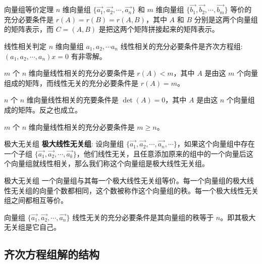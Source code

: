 \documentclass[a4paper,12pt]{ctexart}
\begin{document}
\begin{mythm}{向量组等价定理}{}
    $n$ 维向量组 $\{\vec{a_1}, \vec{a_2}, \cdots , \vec{a_n}\}$ 和 $m$ 维向量组 $\{\vec{b_1}, \vec{b_2}, \cdots , \vec{b_m}\}$ 等价的充分必要条件是 $r(A) = r(B) = r(A,B)$，其中 $A$ 和 $B$ 分别是这两个向量组的矩阵表示，而 $C=(A,B)$ 是把这两个矩阵拼接起来的矩阵表示。
\end{mythm}

\begin{mythm}{线性相关判定}{}
    $n$ 维向量组 $a_1, a_2, \cdots a_n$ 线性相关的充分必要条件是齐次方程组: $(a_1, a_2, \cdots, a_n) x = 0$ 有非零解。
\end{mythm}

\begin{mycor}{}{}
    $m$ 个 $n$ 维向量线性相关的充分必要条件是 $r(A) < m$，其中 $A$ 是由这 $m$ 个向量组成的矩阵，而线性无关的充分必要条件是 $r(A) = m$。
\end{mycor}

\begin{mycor}{}{}
    $n$ 个 $n$ 维向量线性相关的充要条件是 $\det(A) = 0$，其中 $A$ 是由这 $n$ 个向量组成的矩阵。反之也成立。
\end{mycor}

\begin{mycor}{}{}
    $m$ 个 $n$ 维向量线性相关的充分必要条件是 $m \geq n$。
\end{mycor}

\begin{mydef}{极大无关组}{}
    \textbf{极大线性无关组}: 设向量组 $\{\vec{a_1}, \vec{a_2}, \cdots , \vec{a_n}, \cdots\}$，如果这个向量组中存在一个子组 $\{\vec{a_1}, \vec{a_2}, \cdots , \vec{a_k}\}$，他们线性无关，且任意添加原来的组中的一个向量后这个向量组就线性相关，那么我们称这个向量组是极大线性无关组。
\end{mydef}

\begin{mythm}{极大无关组}{}
    一个向量组与其每一个极大线性无关组等价。每一个向量组的极大线性无关组的向量个数都相同，这个数被称作这个向量组的秩。每一个极大线性无关组之间都相互等价。
\end{mythm}

\begin{mythm}{}{}
    向量组 $\{\vec{a_1}, \vec{a_2}, \cdots , \vec{a_n}\}$ 线性无关的充分必要条件是其向量组的秩等于 $n$。即其极大无关组是它自己。
\end{mythm}

\subsection{齐次方程组解的结构}
\end{document}
